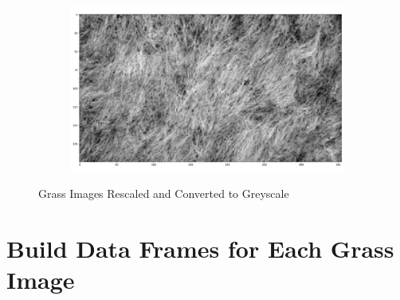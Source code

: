 \documentclass[
  letterpaper,
  DIV=11,
  numbers=noendperiod]{scrreprt}
\begin{document}
\begin{figure}
\begin{minipage}{0.33\linewidth}
\begin{figure}[H]
{}


\end{figure}%

\end{minipage}%
%
\begin{minipage}{0.33\linewidth}

\begin{figure}[H]

{\centering \includegraphics{images/plots/grass/2.jpg}

}


\end{figure}%

\end{minipage}%

\caption{\label{fig-grass-images}Grass Images Rescaled and Converted to
Greyscale}

\end{figure}%

\section{Build Data Frames for Each Grass
Image}\label{build-data-frames-for-each-grass-image}
\end{document}
